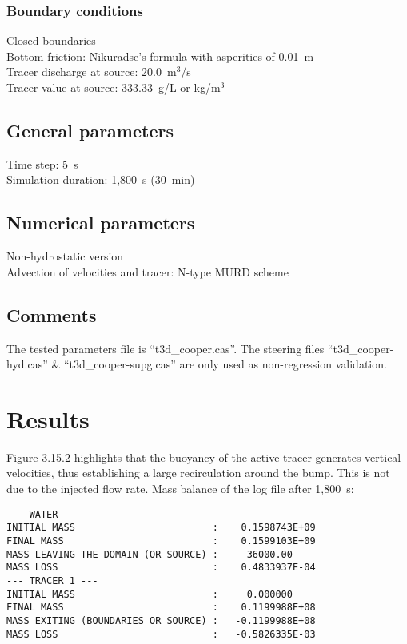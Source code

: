 \subsubsection{Boundary conditions}
%
Closed boundaries\\
Bottom friction: Nikuradse’s formula with asperities of 0.01~m\\
Tracer discharge at source: 20.0~m$^3$/s\\
Tracer value at source: 333.33~g/L or kg/m$^3$
%
\subsection{General parameters}
%
Time step: 5~s\\
Simulation duration: 1,800~s (30~min)
%
%
%
\subsection{Numerical parameters}
%
Non-hydrostatic version\\
Advection of velocities and tracer: N-type MURD scheme
%
\subsection{Comments}
%
The tested parameters file is “t3d\_cooper.cas”.
The steering files “t3d\_cooper-hyd.cas” \& “t3d\_cooper-supg.cas”
are only used as non-regression validation.
%
%
%
\section{Results}
%
Figure 3.15.2 highlights that the buoyancy of the active tracer generates vertical velocities,
thus establishing a large recirculation around the bump.
This is not due to the injected flow rate.
Mass balance of the log file after 1,800~s:
\begin{lstlisting}[language=TelFortran]
--- WATER ---
INITIAL MASS                        :    0.1598743E+09
FINAL MASS                          :    0.1599103E+09
MASS LEAVING THE DOMAIN (OR SOURCE) :    -36000.00    
MASS LOSS                           :    0.4833937E-04
--- TRACER 1 ---
INITIAL MASS                        :     0.000000    
FINAL MASS                          :    0.1199988E+08
MASS EXITING (BOUNDARIES OR SOURCE) :   -0.1199988E+08
MASS LOSS                           :   -0.5826335E-03
\end{lstlisting}

